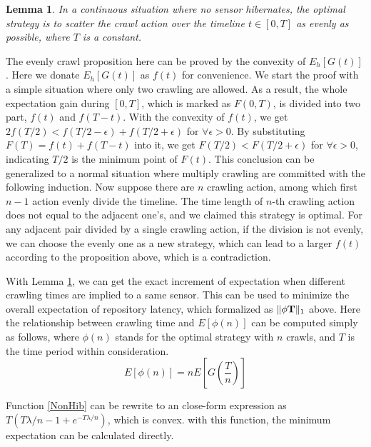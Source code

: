 \documentclass[conference]{IEEEtran}
\newtheorem{lemma}{Lemma}
\begin{document}
\begin{lemma}
\label{evenly}
In a continuous situation where no sensor hibernates, the optimal strategy is to scatter the crawl action over the timeline $t\in [0, T]$ as evenly as possible, where $T$ is a constant.
\end{lemma}
\begin{IEEEproof}
The evenly crawl proposition here can be proved by the convexity of $E_h[G(t)]$ \cite{boyd2004convex}. Here we donate $E_h[G(t)]$ as $f(t)$ for convenience. 
We start the proof with a simple situation where only two crawling are allowed. 
As a result, the whole expectation gain during $[0,T]$, which is marked as $F(0, T)$, is divided into two part, $f(t)$ and $f(T-t)$. With the convexity of $f(t)$, we get $2f(T/2)<f(T/2-\epsilon)+f(T/2+\epsilon)$ for $\forall{\epsilon>0}$. By substituting $F(T)=f(t)+f(T-t)$ into it, we get $F(T/2)<F(T/2+\epsilon)$ for $\forall{\epsilon>0}$, indicating $T/2$ is the minimum point of $F(t)$.
This conclusion can be generalized to a normal situation where multiply crawling are committed with the following induction. 
Now suppose there are $n$ crawling action, among which first $n-1$ action evenly divide the timeline. The time length of $n$-th crawling action does not equal to the adjacent one's, and we claimed this strategy is optimal. For any adjacent pair divided by a single crawling action, if the division is not evenly, we can choose the evenly one as a new strategy, which can lead to a larger $f(t)$ according to the proposition above, which is a contradiction.
\end{IEEEproof}


With Lemma \ref{evenly}, we can get the exact increment of expectation when different crawling times are implied to a same sensor. This can be used to minimize the overall expectation of repository latency, which formalized as $\Arrowvert \phi\mathbf{T} \Arrowvert_{1}$ above.
Here the relationship between crawling time and $E[\phi(n)]$ can be computed simply as follows, where $\phi(n)$ stands for the optimal strategy with $n$ crawls, and $T$ is the time period within consideration. 
\begin{equation}
E[\phi(n)]=nE[G(\frac{T}{n})]\label{NonHib}
\end{equation}

Function \eqref{NonHib} can be rewrite to an close-form expression as $T(T\lambda/n-1+e^{-T\lambda/n})$, which is convex. with this function, the minimum expectation can be calculated directly.
\end{document}
